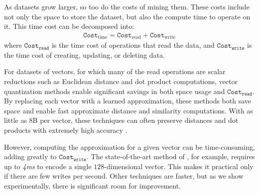 


As datasets grow larger, so too do the costs of mining them. These costs include not only the space to store the dataset, but also the compute time to operate on it. This time cost can be decomposed into:
\begin{align}
    \texttt{Cost}_{\text{time}} = \texttt{Cost}_{\text{read}} + \texttt{Cost}_{\text{write}}
\end{align}
where $\texttt{Cost}_{\texttt{read}}$ is the time cost of operations that read the data, and $\texttt{Cost}_{\texttt{write}}$ is the time cost of creating, updating, or deleting data.

For datasets of vectors, for which many of the read operations are scalar reductions such as Euclidean distance and dot product computations, vector quantization methods enable significant savings in both space usage and $\texttt{Cost}_{\texttt{read}}$. By replacing each vector with a learned approximation, these methods both save space and enable fast approximate distance and similarity computations. With as little as 8B per vector, these techniques can often preserve distances and dot products with extremely high accuracy \cite{lsq,otq,opq,cq,stackedQuantizers}.







However, computing the approximation for a given vector can be time-consuming, adding greatly to $\texttt{Cost}_{\texttt{write}}$. The state-of-the-art method of \cite{lsq}, for example, requires up to \textit{4ms} to encode a single $128$-dimensional vector. This makes it practical only if there are few writes per second. Other techniques are faster, but as we show experimentally, there is significant room for improvement.

